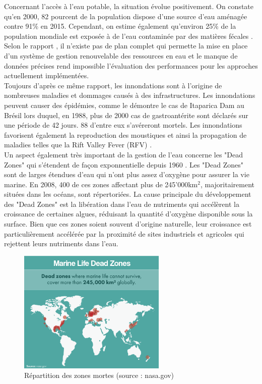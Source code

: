\documentclass[10pt, article]{llncs}
\begin{document}
			Concernant l'accès à l'eau potable, la situation évolue positivement. On constate qu'en 2000, 82 pourcent de la population dispose d'une source d'eau aménagée contre 91\% en 2015. Cependant, on estime également qu'environ 25\% de la population mondiale est exposée à de l'eau contaminée par des matières fécales \cite{united_nations_goal_nodate-4}. \\
			Selon le rapport \cite{rana_water_2017}, il n'existe pas de plan complet qui permette la mise en place d'un système de gestion renouvelable des ressources en eau et le manque de données précises rend impossible l'évaluation des performances pour les approches actuellement implémentées. \\
			Toujours d'après ce même rapport, les innondations sont à l'origine de nombreuses maladies et dommages causés à des infrastructures. Les innondations peuvent causer des épidémies, comme le démontre le cas de Itaparica Dam au Brésil lors duquel, en 1988, plus de 2000 cas de gastroantérite sont déclarés sur une période de 42 jours. 88 d'entre eux s'avéreront mortels. Les innondations favorisent également la reproduction des moustiques et ainsi la propagation de maladies telles que la Rift Valley Fever (RFV) \cite{hanafi_rift_2010}.\\
			Un aspect également très important de la gestion de l'eau concerne les "Dead Zones" qui s'étendent de façon exponnentielle depuis 1960 \cite{diaz_spreading_2008}. Les "Dead Zones" sont de larges étendues d'eau qui n'ont plus assez d'oxygène pour assurer la vie marine. En 2008, 400 de ces zones affectant plus de 245'000km$^{2}$, majoritairement situées dans les océans, sont répertoriées. La cause principale du développement des "Dead Zones" est la libération dans l'eau de nutriments qui accélèrent la croissance de certaines algues, réduisant la quantité d'oxygène disponible sous la surface. Bien que ces zones soient souvent d'origine naturelle, leur croissance est particulièrement accélérée par la proximité de sites industriels et agricoles qui rejettent leurs nutriments dans l'eau.
			\begin{figure}
				\begin{center}
					\includegraphics[width=200pt]{img/marine-life-dead-zones.png}
				\end{center}
				\caption{Répartition des zones mortes (source : nasa.gov)}
			\end{figure}
\end{document}

